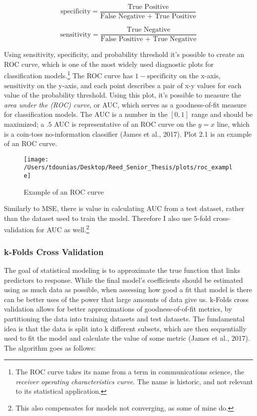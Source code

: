 \documentclass[12pt,twoside]{reedthesis}
\begin{document}
  \[\text{specificity} = \frac{\text{True Positive}}{\text{False Negative + True Positive}}\]
  
  \[\text{sensitivity} = \frac{\text{True Negative}}{\text{False Positive + True Negative}}\]
  
  Using sensitivity, specificity, and probability threshold it's possible
  to create an ROC curve, which is one of the most widely used diagnostic
  plots for classification models.\footnote{The ROC curve takes its name
    from a term in communications science, the \emph{receiver operating
    characteristics curve}. The name is historic, and not relevant to its
    statistical application.} The ROC curve has \(1-\text{specificity}\)
  on the x-axis, \(\text{sensitivity}\) on the y-axis, and each point
  describes a pair of x-y values for each value of the probability
  threshold. Using this plot, it's possible to measure the \emph{area
  under the (ROC) curve}, or AUC, which serves as a goodness-of-fit
  measure for classification models. The AUC is a number in the \([0,1]\)
  range and should be maximized; a \(.5\) AUC is representative of an ROC
  curve on the \(y = x\) line, which is a coin-toss no-information
  classifier (James et al., 2017). Plot 2.1 is an example of an ROC curve.
  
  \begin{figure}
  
  {\centering \texttt{[image: /Users/tdounias/Desktop/Reed\_Senior\_Thesis/plots/roc\_example]} 
  
  }
  
  \caption[Example of an ROC curve]{Example of an ROC curve}\label{fig:roc example}
  \end{figure}
  
  Similarly to MSE, there is value in calculating AUC from a test dataset,
  rather than the dataset used to train the model. Therefore I also use
  5-fold cross-validation for AUC as well.\footnote{This also compensates
    for models not converging, as some of mine do.}
  
  \subsubsection{k-Folds Cross Validation}\label{k-folds-cross-validation}
  
  The goal of statistical modeling is to approximate the true function
  that links predictors to response. While the final model's coefficients
  should be estimated using as much data as possible, when assessing how
  good a fit that model is there can be better uses of the power that
  large amounts of data give us. k-Folds cross validation allows for
  better approximations of goodness-of-of-fit metrics, by partitioning the
  data into training datasets and test datasets. The fundamental idea is
  that the data is split into k different subsets, which are then
  sequentially used to fit the model and calculate the value of some
  metric (James et al., 2017). The algorithm goes as follows:
  
\end{document}
